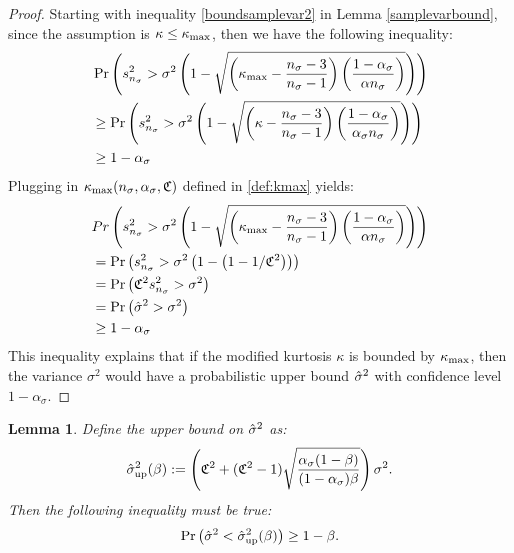 \documentclass{iitthesis}
\newtheorem{lemma}[theorem]{Lemma}
\theoremstyle{definition}
\begin{document}
\begin{proof}
Starting with inequality \eqref{boundsamplevar2} in Lemma \ref{samplevarbound}, since the assumption is $\kappa \leq \kappa_{\max}$, then we have the following inequality: 
\begin{align*}
&\Pr\left( s_{n_{\sigma}}^2 > \sigma^2 \left (1-\sqrt{\left (\kappa_{\max} -\frac{n_{\sigma}-3}{n_{\sigma}-1}\right)\left (\frac{1-\alpha_{\sigma}}{\alpha n_{\sigma}}\right )}\right)\right)\\& \geq\Pr\left( s_{n_{\sigma}}^2 > \sigma^2 \left (1-\sqrt{\left (\kappa-\frac{n_{\sigma}-3}{n_{\sigma}-1}\right)\left (\frac{1-\alpha_{\sigma}}{\alpha_{\sigma} n_{\sigma}}\right )}\right)\right)\\&\geq1-\alpha_{\sigma} 
\end{align*}
 Plugging in $\kappa_{\max}(n_\sigma,\alpha_\sigma, \mathfrak{C})$ defined in \eqref{def:kmax} yields:
 \begin{align*}
&Pr\left( s_{n_{\sigma}}^2 > \sigma^2 \left (1-\sqrt{\left (\kappa_{\max} -\frac{n_{\sigma}-3}{n_{\sigma}-1}\right)\left (\frac{1-\alpha_{\sigma}}{\alpha n_{\sigma}}\right )}\right)\right)\\&
=  \Pr\left( s_{n_{\sigma}}^2 > \sigma^2 \left (1-\left(1-1/\mathfrak{C}^2\right)\right) \right) \\&
=\Pr\left(\mathfrak{C}^2s_{n_{\sigma}}^2  > \sigma^2 \right) \\&
=\Pr\left(\hat{\sigma}^2  > \sigma^2 \right) \\&
\geq  1-\alpha_{\sigma} 
\end{align*}
This inequality explains that if the modified kurtosis $\kappa$ is bounded by $\kappa_{\max}$, then the variance $\sigma^2$ would have a probabilistic upper bound $\hat{\sigma}^2$ with confidence level $1-\alpha_{\sigma}$.
\end{proof}

\begin{lemma}\label{upperboundhsigma}
Define the upper bound on $\hat{\sigma}^2$ as:
\begin{align}\label{sigup}
\hat{\sigma}_{\operatorname{up}}^2 (\beta) := \left(\mathfrak{C}^2+(\mathfrak{C}^2-1)\sqrt{\frac{\alpha_{\sigma}(1-\beta)}{(1-\alpha_{\sigma})\beta}}\right)\sigma^2.
\end{align}
Then the following inequality must be true: 
\begin{align}\label{hsighsigupineq}
\Pr\left(\hat{\sigma}^2 <\hat{\sigma}_{\operatorname{up}}^2(\beta)\right) \geq 1-\beta.
\end{align}
\end{lemma}
\end{document}
